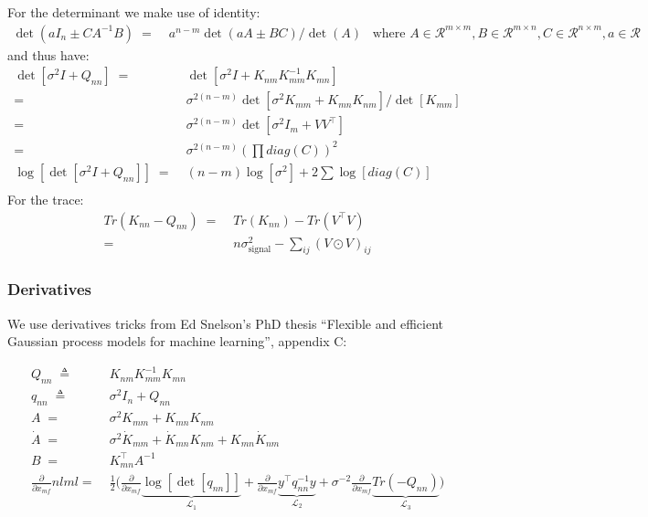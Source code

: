 \documentclass{article}
\newcommand{\inv}{^{-1}}
\newcommand{\T}{^{\top}}
\newcommand{\R}{{\mathcal R}}
\newcommand{\mat}[3]{#1 \in \R^{#2 \times #3}}
\newcommand{\p}[1]{\frac{\partial}{\partial #1}}
\newcommand{\llik}{{\mathcal{L}}}
\begin{document}
For the determinant we make use of identity:
\begin{equation}
\begin{split}
 \det(aI_n \pm C A\inv B) \;=&\; a^{n-m}\det(aA \pm BC)/\det(A) \;\;\; \text{where } \mat{A}{m}{m}, \mat{B}{m}{n}, \mat{C}{n}{m}, a\in\R 
\end{split}
\end{equation}
and thus have:
\begin{equation}
\begin{split}
\det[\sigma^2I+Q_{nn}]\;
 =&\;\det[\sigma^2 I+K_{nm}K_{mm}\inv K_{mn}]\\
 =&\;\sigma^{2(n-m)} \det[\sigma^2 K_{mm}+K_{mn}K_{nm}]/\det[K_{mm}]\\
 =&\;\sigma^{2(n-m)} \det[\sigma^2I_m +VV\T]\\
 =&\;\sigma^{2(n-m)} (\prod diag(C))^2\\
\log[\det[\sigma^2I+Q_{nn}]]\;
 =&\;(n-m)\log[\sigma^2] + 2\sum \log[diag(C)]\\
\end{split}
\end{equation}
%
For the trace:
\begin{equation}
\begin{split}
Tr(K_{nn}-Q_{nn})\;
 =&\;Tr(K_{nn}) - Tr(V\T V)\\
 =&\;n \sigma^2_{\text{signal}} - \sum_{ij}(V\odot V)_{ij}
\end{split}
\end{equation}

\subsubsection*{Derivatives}

We use derivatives tricks from Ed Snelson's PhD thesis 
``Flexible and efficient Gaussian process models for machine learning'', appendix C:

\begin{equation}
\begin{split}
 Q_{nn}\;\triangleq&\;K_{nm}K_{mm}\inv K_{mn} \\
 q_{nn}\;\triangleq&\;\sigma^2I_n+Q_{nn} \\
 A \;=&\; \sigma^2 K_{mm} +K_{mn} K_{nm} \\
 \dot{A} \;=&\; \sigma^2\dot{K}_{mm} + \dot{K}_{mn}K_{nm} + K_{mn}\dot{K}_{nm} \\
 B \;=&\; K_{mn}\T A\inv \\
 \p{x_{mf}} nlml 
  =&\;\tfrac{1}{2} \big(\p{x_{mf}} \underbrace{\log[\det[q_{nn}]]}_{\llik_1} + \p{x_{mf}} \underbrace{y\T q_{nn}\inv y}_{\llik_2} + \sigma^{-2} \p{x_{mf}} \underbrace{Tr(-Q_{nn})}_{\llik_3} \big) \\
\end{split} 
\end{equation}
\end{document}
